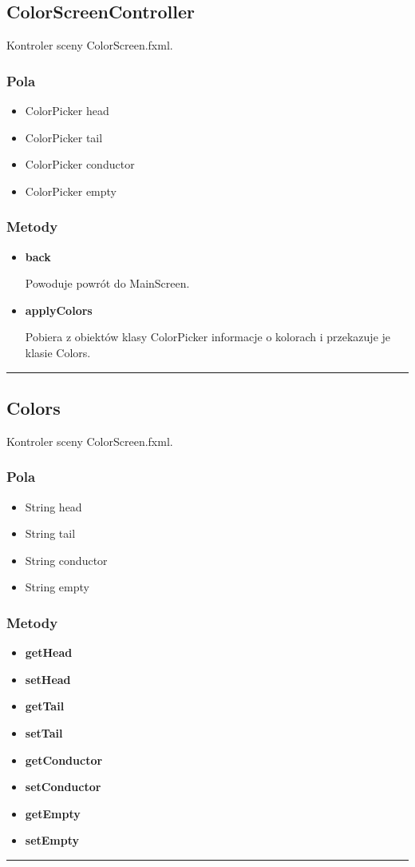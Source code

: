\documentclass[a4paper,11pt]{article}
\newcommand{\linia}{\rule{\linewidth}{0.4mm}}
\begin{document}
\subsection{ColorScreenController}
Kontroler sceny ColorScreen.fxml.
\subsubsection{Pola}
\begin{itemize}
\item ColorPicker head
\item ColorPicker tail
\item ColorPicker conductor
\item ColorPicker empty

\end{itemize}
\subsubsection{Metody}
\begin{itemize}
\item \textbf{back}

Powoduje powrót do MainScreen.
\item \textbf{applyColors}

Pobiera z obiektów klasy ColorPicker informacje o kolorach i przekazuje je klasie Colors.

\end{itemize}
\noindent\linia




\subsection{Colors}
Kontroler sceny ColorScreen.fxml.
\subsubsection{Pola}
\begin{itemize}
\item String head
\item String tail
\item String conductor
\item String empty

\end{itemize}
\subsubsection{Metody}
\begin{itemize}
\item \textbf{getHead}
\item \textbf{setHead}
\item \textbf{getTail}
\item \textbf{setTail}
\item \textbf{getConductor}
\item \textbf{setConductor}
\item \textbf{getEmpty}
\item \textbf{setEmpty}

\end{itemize}
\noindent\linia
\end{document}
